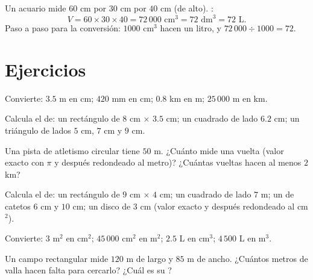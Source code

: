 \begin{example}\label{ex:g6:measure:aquarium}
Un acuario mide $60$ cm por $30$ cm por $40$ cm (de alto). :
\[
V = 60 \times 30 \times 40 = 72\,000 \text{ cm}^3 = 72 \text{ dm}^3
= 72 \text{ L}.
\]
Paso a paso para la conversión: $1000$ cm$^3$ hacen un litro, y
$72\,000 \div 1000 = 72$.
\end{example}

\section{Ejercicios}

\begin{exercise}[$\star$]\label{exo:g6:measure:1}
Convierte: $3.5$ m en cm; $420$ mm en cm; $0.8$ km en m;
$25\,000$ m en km.
\end{exercise}

\begin{exercise}[$\star$]\label{exo:g6:measure:2}
Calcula el  de: un rectángulo de $8$ cm $\times$ $3.5$ cm; un
cuadrado de lado $6.2$ cm; un triángulo de lados $5$ cm, $7$ cm y
$9$ cm.
\end{exercise}

\begin{exercise}[$\star$]\label{exo:g6:measure:3}
Una pista de atletismo circular tiene  $50$ m. ¿Cuánto mide una vuelta
(valor exacto con $\pi$ y después redondeado al metro)? ¿Cuántas vueltas hacen
al menos $2$ km?
\end{exercise}

\begin{exercise}[$\star$]\label{exo:g6:measure:4}
Calcula el  de: un rectángulo de $9$ cm $\times$ $4$ cm; un cuadrado de
lado $7$ m; un  de catetos $6$ cm y $10$ cm; un disco de
 $3$ cm (valor exacto y después redondeado al cm$^2$).
\end{exercise}

\begin{exercise}[$\star$]\label{exo:g6:measure:5}
Convierte: $3$ m$^2$ en cm$^2$; $45\,000$ cm$^2$ en m$^2$; $2.5$ L
en cm$^3$; $4\,500$ L en m$^3$.
\end{exercise}

\begin{exercise}[$\star$]\label{exo:g6:measure:6}
Un campo rectangular mide $120$ m de largo y $85$ m de ancho. ¿Cuántos metros de
valla hacen falta para cercarlo? ¿Cuál es su ?
\end{exercise}

